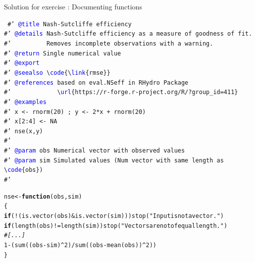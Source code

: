 \documentclass[xcolor=table,       handout,    xcolor=dvipsnames]{beamer}\usepackage[]{graphicx}\usepackage[]{color}
\makeatletter
\newcommand{\hlnum}[1]{\textcolor[rgb]{0,0,0}{#1}}
\newcommand{\hlstr}[1]{\textcolor[rgb]{0.545,0.137,0.137}{#1}}
\newcommand{\hlcom}[1]{\textcolor[rgb]{0,0.392,0}{\textit{#1}}}
\newcommand{\hlopt}[1]{\textcolor[rgb]{0,0,0}{#1}}
\newcommand{\hlstd}[1]{\textcolor[rgb]{0,0,0}{#1}}
\newcommand{\hlkwa}[1]{\textcolor[rgb]{1,0,0}{\textbf{#1}}}
\newcommand{\hlkwb}[1]{\textcolor[rgb]{0,0,0}{#1}}
\newcommand{\hlkwc}[1]{\textcolor[rgb]{1,0,1}{#1}}
\newcommand{\hlkwd}[1]{\textcolor[rgb]{0,0,1}{#1}}
\newenvironment{kframe}{%
 \def\at@end@of@kframe{}%
 \ifinner\ifhmode%
  \def\at@end@of@kframe{\end{minipage}}%
  \begin{minipage}{\columnwidth}%
 \fi\fi%
 \def\FrameCommand##1{\hskip\@totalleftmargin \hskip-\fboxsep
 \colorbox{shadecolor}{##1}\hskip-\fboxsep
     \hskip-\linewidth \hskip-\@totalleftmargin \hskip\columnwidth}%
 \MakeFramed {\advance\hsize-\width
   \@totalleftmargin\z@ \linewidth\hsize
   \@setminipage}}%
 {\par\unskip\endMakeFramed%
 \at@end@of@kframe}
\newenvironment{knitrout}{}{} %
\newcounter{exercisecount}
\makeatother
\begin{document}

\begin{frame}[fragile]{Solution for exercise : Documenting functions}
\begin{knitrout}\scriptsize
{}\color{fgcolor}\begin{kframe}
\texttt{\textcolor[rgb]{0,0.392,0}{
\#' \textcolor{blue}{@title} Nash-Sutcliffe efficiency\\
\#' \textcolor{blue}{@details} Nash-Sutcliffe efficiency as a measure of goodness of fit.\\
\#' ~~~~~~~~ Removes incomplete observations with a warning.\\
\#' \textcolor{blue}{@return} Single numerical value\\
\#' \textcolor{blue}{@export}\\
\#' \textcolor{blue}{@seealso} \textbackslash \textcolor{blue}{code}\{\textbackslash \textcolor{blue}{link}\{rmse\}\}\\
\#' \textcolor{blue}{@references} based on eval.NSeff  in RHydro Package\\
\#' ~~~~~~~~~~~ \textbackslash \textcolor{blue}{url}\{https://r-forge.r-project.org/R/?group\_id=411\}\\
\#' \textcolor{blue}{@examples}\\
\#' x <- rnorm(20) ;  y <- 2*x + rnorm(20)\\
\#' x[2:4] <- NA\\
\#' nse(x,y)\\
\#' \\
\#' \textcolor{blue}{@param} obs Numerical vector with observed values\\
\#' \textcolor{blue}{@param} sim Simulated values (Num vector with same length as \textbackslash \textcolor{blue}{code}\{obs\})\\
\#'}}
\end{kframe}
\end{knitrout}
\vspace{-1.5em}
\begin{knitrout}\scriptsize
{}\color{fgcolor}\begin{kframe}
\begin{alltt}
\hlstd{nse} \hlkwb{<-} \hlkwa{function}\hlstd{(}\hlkwc{obs}\hlstd{,} \hlkwc{sim}\hlstd{)}
\hlstd{\{}
\hlkwa{if}\hlstd{(}\hlopt{!}\hlstd{(}\hlkwd{is.vector}\hlstd{(obs)} \hlopt{&} \hlkwd{is.vector}\hlstd{(sim)))} \hlkwd{stop}\hlstd{(}\hlstr{"Input is not a vector."}\hlstd{)}
\hlkwa{if}\hlstd{(}\hlkwd{length}\hlstd{(obs)} \hlopt{!=} \hlkwd{length}\hlstd{(sim))} \hlkwd{stop}\hlstd{(}\hlstr{"Vectors are not of equal length."}\hlstd{)}
\hlcom{#[...]}
\hlnum{1} \hlopt{-} \hlstd{(} \hlkwd{sum}\hlstd{((obs} \hlopt{-} \hlstd{sim)}\hlopt{^}\hlnum{2}\hlstd{)} \hlopt{/} \hlkwd{sum}\hlstd{((obs} \hlopt{-} \hlkwd{mean}\hlstd{(obs))}\hlopt{^}\hlnum{2}\hlstd{) )}
\hlstd{\}}
\end{alltt}
\end{kframe}
\end{knitrout}

\end{frame}
\end{document}
